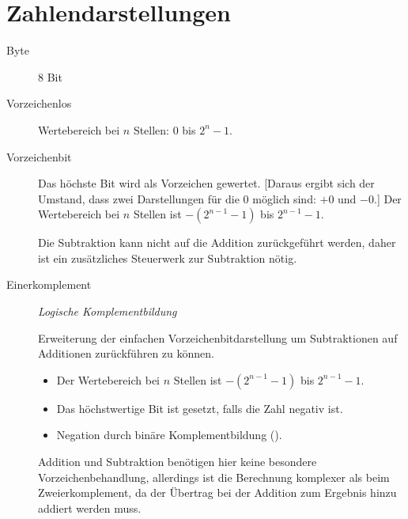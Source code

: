 


\chapter{Zahlendarstellungen}
\begin{description}
  \item [{Byte}] 
	8 Bit
  \item [{Vorzeichenlos}] 
	Wertebereich bei $n$ Stellen: 0 bis $2^n-1$.
  \item [{Vorzeichenbit}] 
    Das höchste Bit wird als Vorzeichen gewertet. [Daraus ergibt sich der Umstand, dass zwei Darstellungen für die 0 möglich sind: $+0$ und $-0$.]
    Der Wertebereich bei $n$ Stellen ist $-(2^{n-1}-1)$ bis $2^{n-1}-1$.

	Die Subtraktion kann nicht auf die Addition zurückgeführt werden, daher ist ein zusätzliches Steuerwerk zur Subtraktion nötig.

  \item [{Einerkomplement}] 
	\emph{Logische Komplementbildung}

	Erweiterung der einfachen Vorzeichenbitdarstellung um Subtraktionen auf Additionen zurückführen zu können.
	\begin{itemize}
	  \item Der Wertebereich bei $n$ Stellen ist $-(2^{n-1}-1)$ bis $2^{n-1}-1$.
	  \item Das höchstwertige Bit ist gesetzt, falls die Zahl negativ ist.
	  \item Negation durch binäre Komplementbildung ().
	\end{itemize}

	Addition und Subtraktion benötigen hier keine besondere Vorzeichenbehandlung, allerdings ist die Berechnung komplexer als beim Zweierkomplement, da der Übertrag bei der Addition zum Ergebnis hinzu addiert werden muss.


\end{description}
